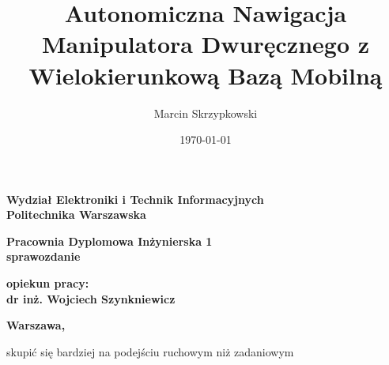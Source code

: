 \documentclass{article}
\title{Autonomiczna Nawigacja Manipulatora Dwuręcznego z Wielokierunkową Bazą Mobilną}
\date{\today}
\author{Marcin Skrzypkowski}
\begin{document}
	
	
	\makeatletter
	\renewcommand{\maketitle}{\begin{titlepage}
		\begin{center}{\LARGE {\bf Wydział Elektroniki i Technik Informacyjnych}}\\
			\vspace{0.4cm}
			{\LARGE {\bf Politechnika Warszawska}}\\
			\vspace{0.3cm}
		\end{center}
		\vspace{5cm}
		\begin{center}
			{\bf \LARGE Pracownia Dyplomowa Inżynierska  1\\ sprawozdanie  \vskip 0.1cm}
		\end{center}
		\vspace{1cm}
		\begin{center}
			{\bf \LARGE \@title}
		\end{center}
		\vspace{2cm}
		\begin{center}
			{\bf \Large \@author \par}
		\end{center}
		\vspace*{\stretch{1}}
		\begin{center}
			{\bf  opiekun pracy: \\ dr inż. Wojciech Szynkniewicz\par}
		\end{center}
		\vspace*{\stretch{5}}
		\begin{center}
			\bf{\large{Warszawa, \@date\vskip 0.1cm}}
		\end{center}
		\end{titlepage}
}
\makeatother	


	

	\maketitle
	\newpage



	\tableofcontents

	\newpage
	\doublespacing
skupić się bardziej na podejściu ruchowym niż zadaniowym 	
	
\end{document}
